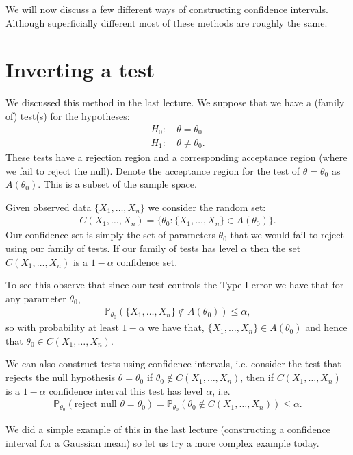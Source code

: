 \documentclass[twoside,12pt]{article}
\begin{document}
We will now discuss a few different ways of constructing confidence intervals. Although superficially different most of these methods are roughly the same.

\section{Inverting a test}
We discussed this method in the last lecture. We suppose that we have a (family of) test(s) for the hypotheses:
\begin{align*}
H_0: &~\theta = \theta_0 \\
H_1: &~\theta \neq \theta_0.
\end{align*}
These tests have a rejection region and a corresponding acceptance region (where we fail to reject the null). Denote the acceptance region for the test of $\theta = \theta_0$ as $A(\theta_0)$. This is a subset of the sample space.


Given observed data $\{X_1,\ldots,X_n\}$ we consider the random set:
\begin{align*}
C(X_1,\ldots,X_n) = \{ \theta_0: \{X_1,\ldots,X_n\} \in A(\theta_0) \}.
\end{align*}
Our confidence set is simply the set of parameters $\theta_0$ that we would fail to reject using our family of tests. If our family of tests has level $\alpha$ then the set $C(X_1,\ldots,X_n)$ is a $1 - \alpha$ confidence set.

To see this observe that since our test controls the Type I error we have that for any parameter $\theta_0$,
\begin{align*}
\mathbb{P}_{\theta_0} (\{X_1,\ldots,X_n\} \notin A(\theta_0)) \leq \alpha,
\end{align*}
so with probability at least $1 - \alpha$ we have that, 
$\{X_1,\ldots,X_n\} \in A(\theta_0)$ and hence that $\theta_0 \in C(X_1,\ldots,X_n)$.

We can also construct tests using confidence intervals, i.e. consider the test that rejects the null hypothesis $\theta = \theta_0$ if $\theta_0 \notin C(X_1,\ldots,X_n)$, then if $C(X_1,\ldots,X_n)$ is a $1 - \alpha$ confidence interval this test has level $\alpha$, i.e.
\begin{align*}
\mathbb{P}_{\theta_0} (\text{reject null } \theta = \theta_0) = \mathbb{P}_{\theta_0}(\theta_0 \notin C(X_1,\ldots,X_n)) \leq \alpha.
\end{align*}

We did a simple example of this in the last lecture (constructing a confidence interval for a Gaussian mean) so let us try a more complex example today.
\end{document}
